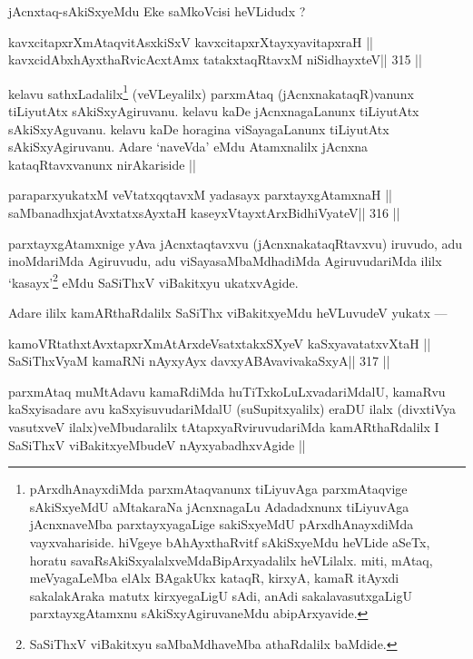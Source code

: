 \begin{artha}
jAcnxtaq-sAkiSxyeMdu Eke saMkoVcisi heVLidudx ?
\end{artha}

\begin{shl}
kavxcitapxrXmAtaqvitAsxkiSxV kavxcitapxrXtayxyavitapxraH ||
kavxcidAbxhAyxthaRvicAcx\s\s tAmx tatakxtaqRtavxM niSidhayxteV\hfill || 315 ||
\end{shl}

\begin{artha}
kelavu sathxLadalilx\footnote[2]{pArxdhAnayxdiMda parxmAtaqvanunx 
tiLiyuvAga parxmAtaqvige sAkiSxyeMdU aMtakaraNa jAcnxnagaLu Adadadxnunx 
tiLiyuvAga jAcnxnaveMba parxtayxyagaLige sakiSxyeMdU pArxdhAnayxdiMda 
vayxvahariside. hiVgeye bAhAyxthaRvitf sAkiSxyeMdu heVLide aSeTx, horatu savaRsAkiSxyalalxveMdaBipArxyadalilx heVLilalx. miti, mAtaq, meVyagaLeMba elAlx BAgakUkx kataqR, kirxyA, kamaR itAyxdi sakalakAraka matutx kirxyegaLigU sAdi, anAdi sakalavasutxgaLigU parxtayxgAtamxnu sAkiSxyAgiruvaneMdu abipArxyavide.} (veVLeyalilx) parxmAtaq (jAcnxnakataqR)vanunx tiLiyutAtx sAkiSxyAgiruvanu. kelavu kaDe jAcnxnagaLanunx tiLiyutAtx sAkiSxyAguvanu. kelavu kaDe horagina viSayagaLanunx tiLiyutAtx sAkiSxyAgiruvanu. Adare `naveVda' eMdu Atamxnalilx jAcnxna kataqRtavxvanunx nirAkariside ||
\end{artha}

\begin{shl}
paraparxyukatxM veVtatxqqtavxM yadasayx parxtayxgAtamxnaH ||
saMbanadhxjatAvxtatxsAyxtaH kaseyxVtayxtArxBidhiVyateV\hfill || 316 ||
\end{shl}

\begin{artha}
parxtayxgAtamxnige yAva jAcnxtaqtavxvu (jAcnxnakataqRtavxvu) iruvudo, adu inoMdariMda Agiruvudu, adu viSayasaMbaMdhadiMda AgiruvudariMda ililx `kasayx'\footnote[3]{SaSiThxV viBakitxyu saMbaMdhaveMba athaRdalilx baMdide.} eMdu SaSiThxV viBakitxyu ukatxvAgide.
\end{artha}

\begin{artha}
Adare ililx kamARthaRdalilx SaSiThx viBakitxyeMdu heVLuvudeV yukatx ---
\end{artha}

\begin{shl}
kamoVRtathxtAvxtapxrXmAtArxdeVsatxtakxSXyeV kaSxyavatatxvXtaH ||
SaSiThxVyaM kamaRNi nAyxyAyx davxyABAvavivakaSxyA\hfill || 317 ||
\end{shl}

\begin{artha}
parxmAtaq muMtAdavu kamaRdiMda huTiTxkoLuLxvadariMdalU, kamaRvu kaSxyisadare avu kaSxyisuvudariMdalU (suSupitxyalilx) eraDU ilalx (divxtiVya vasutxveV ilalx)veMbudaralilx tAtapxyaRviruvudariMda kamARthaRdalilx I SaSiThxV viBakitxyeMbudeV nAyxyabadhxvAgide ||
\end{artha}


